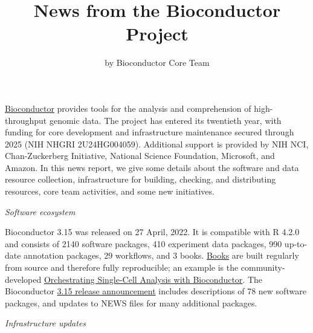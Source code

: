
\title{News from the Bioconductor Project}
\author{by Bioconductor Core Team}
\maketitle

\href{https://bioconductor.org}{Bioconductor} provides
tools for the analysis and comprehension of high-throughput genomic
data.  The project has entered its twentieth year, with funding
for core development and infrastructure maintenance secured
through 2025 (NIH NHGRI 2U24HG004059).  Additional support is provided
by NIH NCI, Chan-Zuckerberg Initiative, National Science Foundation,
Microsoft, and Amazon.  In this news report, we give some
details about the software and data resource collection,
infrastructure for building, checking, and distributing resources,
core team activities, and some new initiatives.
 
\textit{Software ecosystem}

Bioconductor 3.15 was released on 27 April, 2022. It is
compatible with R 4.2.0 and consists of 2140 software packages, 410
experiment data packages, 990 up-to-date annotation packages, 29
workflows, and 3 books. \href{https://bioconductor.org/books/release/}{Books} are
built regularly from source and therefore fully
reproducible; an example is the
community-developed \href{https://bioconductor.org/books/release/OSCA/}{Orchestrating
Single-Cell Analysis with Bioconductor}.
The Bioconductor
\href{https://bioconductor.org/news/bioc_3_15_release/}{3.15 release
  announcement} includes descriptions of 78 new software packages,
and updates to NEWS files for many additional packages.  

\textit{Infrastructure updates}

